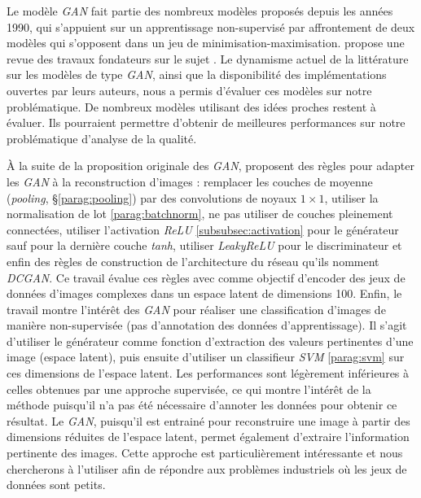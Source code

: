 Le modèle \textit{GAN} fait partie des nombreux modèles proposés depuis les années 1990, qui s'appuient sur un apprentissage non-supervisé par affrontement de deux modèles qui s'opposent dans un jeu de minimisation-maximisation.
\citeauthor{schmidhuber_unsupervised_2019} propose une revue des travaux fondateurs sur le sujet \cite{schmidhuber_unsupervised_2019}.
Le dynamisme actuel de la littérature sur les modèles de type \textit{GAN}, ainsi que la disponibilité des implémentations ouvertes par leurs auteurs, nous a permis d'évaluer ces modèles sur notre problématique.
De nombreux modèles utilisant des idées proches restent à évaluer.
Ils pourraient permettre d'obtenir de meilleures performances sur notre problématique d'analyse de la qualité.

À la suite de la proposition originale des \textit{GAN}, \citeauthor{radford_unsupervised_2015} \cite{radford_unsupervised_2015} proposent des règles pour adapter les \textit{GAN} à la reconstruction d'images : remplacer les couches de moyenne (\textit{pooling}, §\ref{parag:pooling}) par des convolutions de noyaux $1 \times 1$, utiliser la normalisation de lot \ref{parag:batchnorm}, ne pas utiliser de couches pleinement connectées, utiliser l'activation \textit{ReLU} \ref{subsubsec:activation} pour le générateur sauf pour la dernière couche \textit{tanh}, utiliser \textit{LeakyReLU} pour le discriminateur et enfin des règles de construction de l'architecture du réseau qu'ils nomment \textit{DCGAN}.
Ce travail évalue ces règles avec comme objectif d'encoder des jeux de données d'images complexes dans un espace latent de dimensions 100.
Enfin, le travail montre l'intérêt des \textit{GAN} pour réaliser une classification d'images de manière non-supervisée (pas d'annotation des données d'apprentissage).
Il s'agit d'utiliser le générateur comme fonction d'extraction des valeurs pertinentes d'une image (espace latent), puis ensuite d'utiliser un classifieur \textit{SVM} \ref{parag:svm} sur ces dimensions de l'espace latent.
Les performances sont légèrement inférieures à celles obtenues par une approche supervisée, ce qui montre l'intérêt de la méthode puisqu'il n'a pas été nécessaire d'annoter les données pour obtenir ce résultat.
Le \textit{GAN}, puisqu'il est entrainé pour reconstruire une image à partir des dimensions réduites de l'espace latent, permet également d'extraire l'information pertinente des images.
Cette approche est particulièrement intéressante et nous chercherons à l'utiliser afin de répondre aux problèmes industriels où les jeux de données sont petits.

